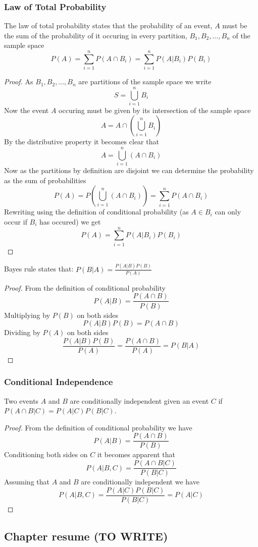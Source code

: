 \subsubsection{Law of Total Probability}
The law of total probability states that the probability of an event, $A$ must be the sum of the probability of it occuring in every partition, $B_{1},B_{2},\ldots,B_{n}$ of the sample space
\[
    P(A)=\sum_{i=1}^{n}P(A\cap B_{i})=\sum_{i=1}^{n}P(A|B_{i})P(B_{i})
\]
\begin{proof}
  As $B_{1},B_{2},\ldots,B_{n}$ are partitions of the sample space we write
  \[
      S=\bigcup_{i=1}^{n} B_{i}
  \]
  Now the event $A$ occuring must be given by its intersection of the sample space
  \[
      A=A\cap\left(\bigcup_{i=1}^{n} B_{i}\right)
  \]
  By the distributive property it becomes clear that
  \[
      A=\bigcup_{i=1}^{n} (A\cap B_{i})
  \]
  Now as the partitions by definition are disjoint we can determine the probability as the sum of probabilities
  \[
      P(A)=P\left(\bigcup_{i=1}^{n} (A\cap B_{i})\right)=\sum_{i=1}^{n}P(A\cap B_{i})
  \]
  Rewriting using the definition of conditional probability (as $A\in B_{i}$ can only occur if $B_{i}$ has occured) we get
  \[
      P(A)=\sum_{i=1}^{n}P(A|B_{i})P(B_{i})
  \]
\end{proof}
\begin{theorem}
  Bayes rule states that: $P(B|A)=\frac{P(A|B)P(B)}{P(A)}$
\end{theorem}
\begin{proof}
  From the definition of conditional probability
  \[
      P(A|B)=\frac{P(A\cap B)}{P(B)}
  \]
  Multiplying by $P(B)$ on both sides
  \[
      P(A|B)P(B)=P(A\cap B)
  \]
  Dividing by $P(A)$ on both sides
  \[
      \frac{P(A|B)P(B)}{P(A)}=\frac{P(A\cap B)}{P(A)}=P(B|A)
  \]
\end{proof}
\subsubsection{Conditional Independence}
\begin{definition}
  Two events $A$ and $B$ are conditionally independent given an event $C$ if $P(A\cap B|C)=P(A|C)P(B|C)$.
\end{definition}
\begin{proof}
  From the definition of conditional probability we have
  \[
      P(A|B)=\frac{P(A\cap B)}{P(B)}
  \]
  Conditioning both sides on $C$ it becomes apparent that
  \[
      P(A|B,C)=\frac{P(A\cap B|C)}{P(B|C)}
  \]
  Assuming that $A$ and $B$ are conditionally independent we have
  \[
      P(A|B,C)=\frac{P(A|C)P(B|C)}{P(B|C)}=P(A|C)
  \]
\end{proof}
\subsection{Chapter resume (TO WRITE)}
